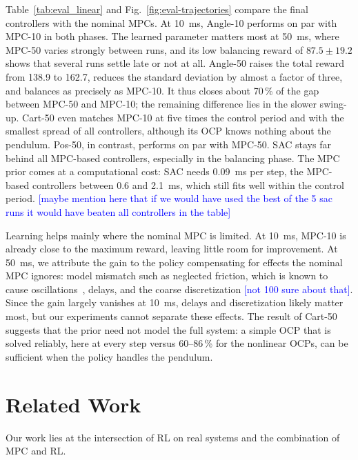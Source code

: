 \documentclass{l4dc2027}
\let\cite\citep
\newcommand{\zopangle}{Angle-50\xspace}
\newcommand{\zoppos}{Pos-50\xspace}
\newcommand{\zopcart}{Cart-50\xspace}
\newcommand{\zopangleten}{Angle-10\xspace}
\newcommand{\mpcfifty}{MPC-50\xspace}
\newcommand{\mpcten}{MPC-10\xspace}
\newcommand{\note}[1]{\textcolor{blue}{[#1]}}
\begin{document}
Table~\ref{tab:eval_linear} and Fig.~\ref{fig:eval-trajectories} compare the
final controllers with the nominal MPCs. At 10~ms, \zopangleten performs on par
with \mpcten in both phases. The learned parameter matters most at 50~ms, where
\mpcfifty varies strongly between runs, and its low balancing reward of
$87.5\pm19.2$ shows that several runs settle late or not at all. \zopangle raises the total reward from 138.9 to
162.7, reduces the standard deviation by almost a factor of three, and balances
as precisely as \mpcten. It thus closes about 70\,\% of the gap between
\mpcfifty and \mpcten; the remaining difference lies in the slower swing-up.
\zopcart even matches \mpcten at five times the control period and with the
smallest spread of all controllers, although its OCP knows nothing about the
pendulum. \zoppos, in contrast, performs on par with \mpcfifty. SAC stays far
behind all MPC-based controllers, especially in the balancing phase. The MPC
prior comes at a computational cost: SAC needs 0.09~ms per step, the MPC-based
controllers between 0.6 and 2.1~ms, which still fits well within the control
period. \note{maybe mention here that if we would have used the best of the 5 sac runs it would have beaten all controllers in the table}

Learning helps mainly where the nominal MPC is limited. At 10~ms, \mpcten is
already close to the maximum reward, leaving little room for improvement. At
50~ms, we attribute the gain to the policy compensating for effects the
nominal MPC ignores: model mismatch such as neglected friction, which is known
to cause oscillations~\cite{campbell2008friction}, delays, and the coarse
discretization \note{not 100 sure about that}. Since the gain largely vanishes at 10~ms, delays and discretization likely matter most, but our experiments cannot separate these
effects. The result of \zopcart suggests that the prior need not model the
full system: a simple OCP that is solved reliably, here at every step versus
60--86\,\% for the nonlinear OCPs, can be sufficient when the policy handles
the pendulum.

\section{Related Work}
\label{sec:related}

Our work lies at the intersection of \ac{RL} on real systems
and the combination of \ac{MPC} and \ac{RL}.
\end{document}
